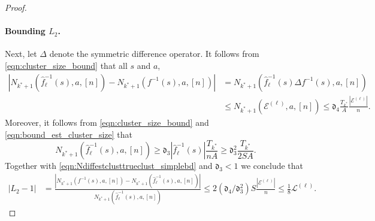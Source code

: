\documentclass[11pt]{article}
\newcommand{\mf}[1]{\mathfrak{#1}}
\newcommand{\mcE}{\mathcal{E}}
\newcommand{\mcL}{\mathcal{L}}
\theoremstyle{definition}
\theoremstyle{definition}
\begin{document}
\begin{proof}
	\paragraph{Bounding $L_2$.}
	Next, let $\Delta$ denote the symmetric difference operator.
	It follows from \eqref{eqn:cluster_size_bound} that all $s$ and $a$,
	\begin{equation}
		\label{eqn:Ndiffestclusttrueclust_simplebd}
		\begin{split}
			|N_{k^*+1}(\hat{f}_{\ell}^{-1}(s),a,[n])-N_{k^*+1}(f^{-1}(s),a,[n])|
			 &
			=
			N_{k^*+1}(\hat{f}_{\ell}^{-1}(s)\Delta f^{-1}(s),a,[n])
			\\
			 &
			\leq
			N_{k^*+1}(\mcE^{(\ell)},a,[n])
			\leq
			\mf{d}_4\frac{T_{k^*}}{A}\frac{|\mcE^{(\ell)}|}{n}.
		\end{split}
	\end{equation}
	Moreover, it follows from \eqref{eqn:cluster_size_bound} and \eqref{eqn:bound_est_cluster_size} that
	\begin{equation}
		N_{k^*+1}(\hat{f}_{\ell}^{-1}(s),a,[n])
		\geq
		\mf{d}_3|\hat{f}_{\ell}^{-1}(s)|\frac{T_{k^*}}{nA}
		\geq
		\mf{d}_3^2 \frac{T_{k^*}}{2SA}
		.
	\end{equation}
	Together with \eqref{eqn:Ndiffestclusttrueclust_simplebd} and $\mf{d}_3<1$ we conclude that
	\begin{equation}
		\begin{split}
			\left|L_2-1\right|
			 &
			=
			\frac{|N_{k^*+1}(f^{-1}(s),a,[n])-N_{k^*+1}(\hat{f}_{\ell}^{-1}(s),a,[n])|}{N_{k^*+1}(\hat{f}_{\ell}^{-1}(s),a,[n])}
			\leq
			2(\mf{d}_4/\mf{d}_3^2)S\frac{|\mcE^{(\ell)}|}{n}
			\leq
			\frac{1}{8}
			\mcL^{(\ell)}
			.
		\end{split}
	\end{equation}

\end{proof}
\end{document}
